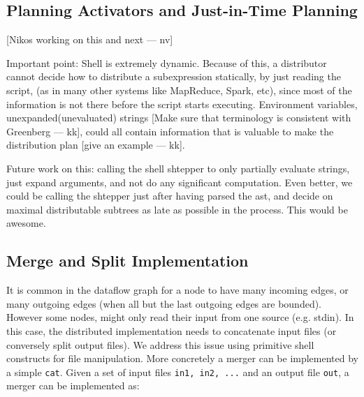 \documentclass[sigplan,10pt,review,anonymous]{acmart}
\newcommand{\nv}[1]{[{\color{cyan}#1 --- nv}]}
\newcommand{\kk}[1]{[{\color{magenta}#1 --- kk}]}
\newcommand{\tr}[1]{} %
\begin{document}



\subsection{Planning Activators and Just-in-Time Planning}

\nv{Nikos working on this and next}


Important point: Shell is extremely dynamic. Because of this, a
distributor cannot decide how to distribute a subexpression
statically, by just reading the script, (as in many other systems like
MapReduce, Spark, etc), since most of the information is not there
before the script starts executing. Environment variables,
unexpanded(unevaluated) strings \kk{Make sure that terminology is
  consistent with Greenberg}, could all contain information that is
valuable to make the distribution plan \kk{give an example}.


Future work on this: calling the shell shtepper to only partially
evaluate strings, just expand arguments, and not do any significant
computation. Even better, we could be calling the shtepper just after
having parsed the ast, and decide on maximal distributable subtrees as
late as possible in the process. This would be awesome.

\subsection{Merge and Split Implementation}

It is common in the dataflow graph for a node to have many incoming
edges, or many outgoing edges (when all but the last outgoing edges
are bounded). However some nodes, might only read their input from one
source (e.g. stdin). In this case, the distributed implementation
needs to concatenate input files (or conversely split output
files).
%
%
We address this issue using primitive shell constructs for file
manipulation. More concretely a merger can be implemented by a simple
\verb|cat|. Given a set of input files \verb|in1, in2, ...| and an
output file \verb|out|, a merger can be implemented as:
\end{document}
